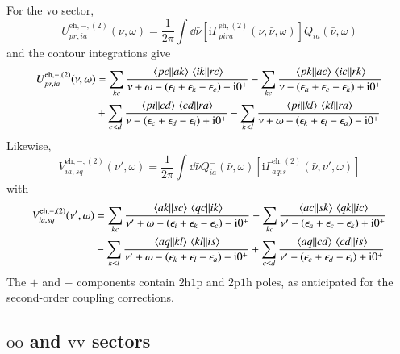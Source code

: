 \documentclass[aip,jcp,reprint,noshowkeys,superscriptaddress]{revtex4-1}
\newcommand{\eps}{\epsilon}
\newcommand{\ii}{\mathrm{i}}
\newcommand{\hhp}{\text{2h1p}}
\newcommand{\pph}{\text{2p1h}}
\newcommand{\eh}{\text{eh}}
\begin{document}
For the $\text{vo}$ sector,
\begin{equation}
    U^{\eh,-,(2)}_{pr,ia}(\nu,\omega)
    =
    \frac{1}{2\pi}
    \int\dd{\bar\nu}
    \left[
    \ii\Gamma^{\eh,(2)}_{pira}(\nu,\bar\nu,\omega)
    \right]
    Q^-_{ia}(\bar\nu,\omega)
    \label{eq:U_eh_second_minus_def}
\end{equation}
and the contour integrations give
\begin{equation}
    \begin{split}
    U^{\eh,-,(2)}_{pr,ia}(\nu,\omega)
    & =
    \sum_{kc}
    \frac{\mel{pc}{}{ak}\mel{ik}{}{rc}}
    {\nu+\omega-(\eps_i+\eps_k-\eps_c)-\ii0^+}
    -
    \sum_{kc}
    \frac{\mel{pk}{}{ac}\mel{ic}{}{rk}}
    {\nu-(\eps_a+\eps_c-\eps_k)+\ii0^+}
    \\
    &+
    \sum_{c<d}
    \frac{\mel{pi}{}{cd}\mel{cd}{}{ra}}
    {\nu-(\eps_c+\eps_d-\eps_i)+\ii0^+}
    -
    \sum_{k<l}
    \frac{\mel{pi}{}{kl}\mel{kl}{}{ra}}
    {\nu+\omega-(\eps_k+\eps_l-\eps_a)-\ii0^+}
    \end{split}
    \label{eq:U_eh_second_minus_explicit}
\end{equation}
Likewise,
\begin{equation}
    V^{\eh,-,(2)}_{ia,sq}(\nu',\omega)
    =
    \frac{1}{2\pi}
    \int\dd{\bar\nu}
    Q^-_{ia}(\bar\nu,\omega)
    \left[
    \ii\Gamma^{\eh,(2)}_{aqis}(\bar\nu,\nu',\omega)
    \right]
    \label{eq:V_eh_second_minus_def}
\end{equation}
with
\begin{equation}
    \begin{split}
    V^{\eh,-,(2)}_{ia,sq}(\nu',\omega)
    & =
    \sum_{kc}
    \frac{\mel{ak}{}{sc}\mel{qc}{}{ik}}
    {\nu'+\omega-(\eps_i+\eps_k-\eps_c)-\ii0^+}
    -
    \sum_{kc}
    \frac{\mel{ac}{}{sk}\mel{qk}{}{ic}}
    {\nu'-(\eps_a+\eps_c-\eps_k)+\ii0^+}
    \\
    &-
    \sum_{k<l}
    \frac{\mel{aq}{}{kl}\mel{kl}{}{is}}
    {\nu'+\omega-(\eps_k+\eps_l-\eps_a)-\ii0^+}
    +
    \sum_{c<d}
    \frac{\mel{aq}{}{cd}\mel{cd}{}{is}}
    {\nu'-(\eps_c+\eps_d-\eps_i)+\ii0^+}
    \end{split}
    \label{eq:V_eh_second_minus_explicit}
\end{equation}
The $+$ and $-$ components contain $\hhp$ and $\pph$ poles,
as anticipated for the second-order coupling corrections.

\subsection{$\text{oo}$ and $\text{vv}$ sectors}
\end{document}

